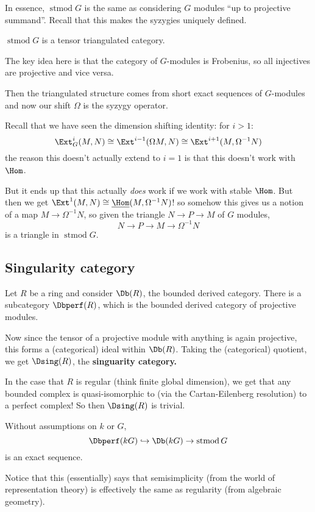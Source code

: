 \documentclass[12pt]{article}
\DeclareMathOperator{\stmod}{stmod}
\begin{document}
In essence, $\stmod G$ is the same as considering $G$ modules ``up to projective summand''. Recall that this makes the syzygies 
uniquely defined.

\begin{prop}
	$\stmod G$ is a tensor triangulated category.
\end{prop}
\begin{prf}
	The key idea here is that the category of $G$-modules is Frobenius, so all injectives are projective and vice versa.

	Then the triangulated structure comes from short exact sequences of $G$-modules and now our shift $\Omega$ is the syzygy operator.

	Recall that we have seen the dimension shifting identity: for $i>1$:
	\[\Ext_G^i(M,N)\cong\Ext^{i-1}(\Omega M,N)\cong\Ext^{i+1}(M,\Omega^{-1}N)\]
	the reason this doesn't actually extend to $i=1$ is that this doesn't work with $\Hom$.

	But it ends up that this actually \textit{does} work if we work with stable $\Hom$. But then we get $\Ext^1(M,N)\cong\underline{\Hom}(M,\Omega^{-1}N)$!
	so somehow this gives us a notion of a map $M\to \Omega^{-1}N$, so given the triangle $N\to P \to M$ of $G$ modules,
	\[N\to P\to M\to \Omega^{-1}N\]
	is a triangle in $\stmod G$.
\end{prf}

\subsection{Singularity category}
Let $R$ be a ring and consider $\Db(R)$, the bounded derived category. There is a subcategory $\Dbperf(R)$,
which is the bounded derived category of projective modules.

Now since the tensor of a projective module with anything is again projective, this forms a (categorical) ideal within $\Db(R)$. Taking the 
(categorical) quotient, we get $\Dsing(R)$, the \textbf{singuarity category.}

In the case that $R$ is regular (think finite global dimension), we get that any bounded complex is quasi-isomorphic to (via the Cartan-Eilenberg resolution)
to a perfect complex! So then $\Dsing(R)$ is trivial.

\begin{thm}
	Without assumptions on $k$ or $G$,
	\[\Dbperf(kG)\hookrightarrow \Db(kG)\to\stmod G\]
	is an exact sequence.
\end{thm}
\begin{rmk}
	Notice that this (essentially) says that semisimplicity (from the world of representation theory) is
	effectively the same as regularity (from algebraic geometry).
\end{rmk}
\end{document}
